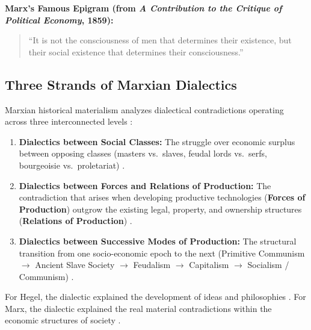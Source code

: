 \begin{KeyConcept}
\textbf{Marx's Famous Epigram (from \textit{A Contribution to the Critique of Political Economy}, 1859):}
\begin{quote}
``It is not the consciousness of men that determines their existence, but their social existence that determines their consciousness.'' 
\end{quote}
\end{KeyConcept}

\subsection{Three Strands of Marxian Dialectics}

Marxian historical materialism analyzes dialectical contradictions operating across three interconnected levels :
\begin{enumerate}
    \item \textbf{Dialectics between Social Classes:} The struggle over economic surplus between opposing classes (masters vs.\ slaves, feudal lords vs.\ serfs, bourgeoisie vs.\ proletariat) .
    \item \textbf{Dialectics between Forces and Relations of Production:} The contradiction that arises when developing productive technologies (\textbf{Forces of Production}) outgrow the existing legal, property, and ownership structures (\textbf{Relations of Production}) .
    \item \textbf{Dialectics between Successive Modes of Production:} The structural transition from one socio-economic epoch to the next (Primitive Communism $\rightarrow$ Ancient Slave Society $\rightarrow$ Feudalism $\rightarrow$ Capitalism $\rightarrow$ Socialism / Communism) .
\end{enumerate}

\begin{ComparisonBox}
For Hegel, the dialectic explained the development of ideas and philosophies . For Marx, the dialectic explained the real material contradictions within the economic structures of society .
\end{ComparisonBox}

